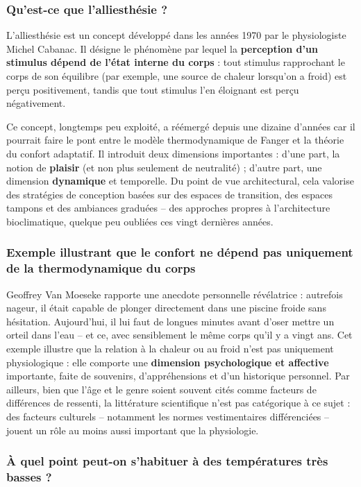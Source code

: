 \subsubsection{Qu'est-ce que l'alliesthésie ?}

L'alliesthésie est un concept développé dans les années 1970 par le physiologiste Michel Cabanac. Il désigne le phénomène par lequel la \textbf{perception d'un stimulus dépend de l'état interne du corps} : tout stimulus rapprochant le corps de son équilibre (par exemple, une source de chaleur lorsqu'on a froid) est perçu positivement, tandis que tout stimulus l'en éloignant est perçu négativement.

Ce concept, longtemps peu exploité, a réémergé depuis une dizaine d'années car il pourrait faire le pont entre le modèle thermodynamique de Fanger et la théorie du confort adaptatif. Il introduit deux dimensions importantes : d'une part, la notion de \textbf{plaisir} (et non plus seulement de neutralité) ; d'autre part, une dimension \textbf{dynamique} et temporelle. Du point de vue architectural, cela valorise des stratégies de conception basées sur des espaces de transition, des espaces tampons et des ambiances graduées -- des approches propres à l'architecture bioclimatique, quelque peu oubliées ces vingt dernières années.

\subsubsection{Exemple illustrant que le confort ne dépend pas uniquement de la thermodynamique du corps}

Geoffrey Van Moeseke rapporte une anecdote personnelle révélatrice : autrefois nageur, il était capable de plonger directement dans une piscine froide sans hésitation. Aujourd'hui, il lui faut de longues minutes avant d'oser mettre un orteil dans l'eau -- et ce, avec sensiblement le même corps qu'il y a vingt ans. Cet exemple illustre que la relation à la chaleur ou au froid n'est pas uniquement physiologique : elle comporte une \textbf{dimension psychologique et affective} importante, faite de souvenirs, d'appréhensions et d'un historique personnel. Par ailleurs, bien que l'âge et le genre soient souvent cités comme facteurs de différences de ressenti, la littérature scientifique n'est pas catégorique à ce sujet : des facteurs culturels -- notamment les normes vestimentaires différenciées -- jouent un rôle au moins aussi important que la physiologie.

\subsubsection{À quel point peut-on s'habituer à des températures très basses ?}

